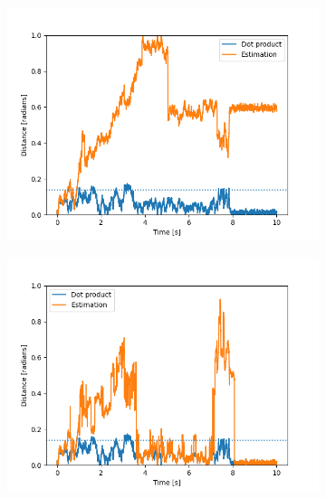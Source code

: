 \documentclass[final,3p, twocolumn]{elsarticle}
\begin{document}
\begin{figure}[t]
	\centering
	\begin{subfigure}{0.33\textwidth}
		\includegraphics[width=\textwidth]{Error_10_percent.png}
	\end{subfigure}
	\begin{subfigure}{0.33\textwidth}
		\includegraphics[width=\textwidth]{Error_20_percent.png}
	\end{subfigure}
	\begin{subfigure}{0.33\textwidth}

\end{subfigure}
\end{figure}
\end{document}
